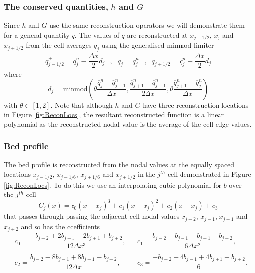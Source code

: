 \documentclass[AMA,STIX1COL]{WileyNJD-v2}
\begin{document}
\subsubsection{The conserved quantities, $h$ and $G$ }
Since $h$ and $G$ use the same reconstruction operators we will demonstrate them for a general quantity $q$. The values of $q$ are reconstructed at $x_{j-1/2} $, $x_{j} $ and $x_{j+1/2}$ from the cell averages $\overline{q}_j$ using the generalised minmod limiter \cite{VanLeer-1979-101}
	\begin{align}
	q^+_{j-1/2} = \overline{q}^n_j - \dfrac{\Delta x}{2} d_j &,&
	q_{j}  =\overline{q}^n_j &,&
	q^-_{j+1/2}  = \overline{q}^n_j + \dfrac{\Delta x}{2} d_j
		\label{eqn:ReconforhwG}
	\end{align}
where 
\begin{equation}
d_j = \text{minmod}\left(\theta \dfrac{\overline{q}^n_j -\overline{q}^n_{j-1} }{\Delta x}, \dfrac{\overline{q}^n_{j+1} -\overline{q}^n_{j-1} }{2\Delta x}, \theta\dfrac{\overline{q}^n_{j+1} -\overline{q}^n_{j} }{\Delta x}\right)
\label{eqn:slopehGrecon}
\end{equation}
with $\theta \in \left[1,2\right]$. Note that although $h$ and $G$ have three reconstruction locations in Figure \ref{fig:ReconLocs}, the resultant reconstructed function is a linear polynomial as the reconstructed nodal value is the average of the cell edge values. 

\subsubsection{Bed profile }
The bed profile is reconstructed from the nodal values at the equally spaced locations $x_{j-1/2}$, $x_{j-1/6}$, $x_{j+1/6}$ and $x_{j+1/2}$ in the $j^{th}$ cell demonstrated in Figure \ref{fig:ReconLocs}. To do this we use an interpolating cubic polynomial for $b$ over the $j^{th}$ cell 
\begin{equation*}
C_j(x) = c_0 \left(x - x_j\right)^3 + c_1 \left(x - x_j\right)^2 + c_2 \left(x - x_j\right) + c_3
\label{eqn:cubicforbedrecon}
\end{equation*}
that passes through passing the adjacent cell nodal values $x_{j-2}$, $x_{j-1}$, $x_{j+1}$ and $x_{j+2}$ and so has the coefficients
\begin{align*}
&c_0 =  \dfrac{-b_{j-2} + 2b_{j-1} - 2 b_{j+1} + b_{j+2}}{12 \Delta x^3}, & &
c_1 =  \dfrac{b_{j-2} - b_{j-1} - b_{j+1} + b_{j+2}}{6 \Delta x^2},\\ \\
&c_2 =  \dfrac{b_{j-2} - 8b_{j-1} + 8 b_{j+1} - b_{j+2}}{12 \Delta x},& &
c_3 =  \dfrac{-b_{j-2}  + 4b_{j-1} + 4 b_{j+1} - b_{j+2}}{6}.
\end{align*}
\end{document}
